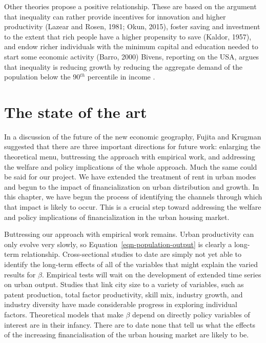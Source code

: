  
 Other theories propose a positive relationship. These are based on the argument that inequality can rather provide incentives for innovation and higher productivity (Lazear and Rosen, 1981; Okun, 2015), foster saving and investment to the extent that rich people have a higher propensity to save (Kaldor, 1957), and endow richer individuals with the minimum capital and education needed to start some economic activity (Barro, 2000)
Bivens, reporting on the USA, argues that inequality is reducing growth by reducing the aggregate demand of the population below the 90$^{th}$ percentile in income \cite{bivensInequalitySlowingUS2017}.

\section{The state of the art}
In a discussion of the  future of the new economic geography, Fujita and Krugman suggested that there are three important directions for future work: enlarging the theoretical menu, buttressing the approach with empirical work, and addressing the welfare and policy implications of the whole approach. Much the same could be said for our project. We have extended the treatment of rent in urban modes and begun to the impact of financialization on urban distribution and growth. In this chapter, we have begun the process of identifying the channels through which  that impact is likely to occur. This is a crucial step toward  addressing the welfare and policy implications of financialization in the urban housing market.
 
Buttressing our approach with empirical work remains. Urban productivity can only evolve very slowly, so Equation~\ref{eqn-population-output} is clearly a long-term relationship. Cross-sectional studies to date are simply not yet able to identify the long-term effects of all of  the variables that might explain the varied results for  $\beta$. Empirical tests will wait on the development of extended time series on urban output.
Studies that link city size to a variety of variables, such as patent production, total factor productivity, skill mix, industry growth, and industry diversity have made considerable progress in exploring individual factors. Theoretical models that make $\beta$ depend on directly policy variables of interest are in their infancy. There are to date  none that tell us what the effects of the increasing financialisation of the urban housing market are likely to be.  
 


